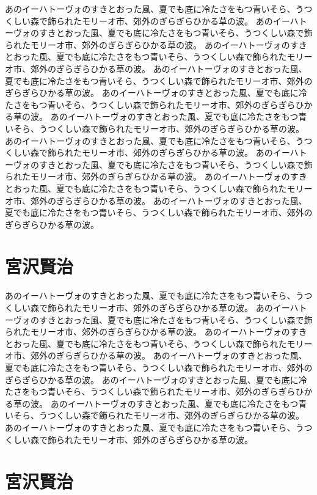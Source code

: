 \documentclass[b5j]{jsbook}
\begin{document}
あのイーハトーヴォのすきとおった風、夏でも底に冷たさをもつ青いそら、うつくしい森で飾られたモリーオ市、郊外のぎらぎらひかる草の波。
あのイーハトーヴォのすきとおった風、夏でも底に冷たさをもつ青いそら、うつくしい森で飾られたモリーオ市、郊外のぎらぎらひかる草の波。
あのイーハトーヴォのすきとおった風、夏でも底に冷たさをもつ青いそら、うつくしい森で飾られたモリーオ市、郊外のぎらぎらひかる草の波。
あのイーハトーヴォのすきとおった風、夏でも底に冷たさをもつ青いそら、うつくしい森で飾られたモリーオ市、郊外のぎらぎらひかる草の波。
あのイーハトーヴォのすきとおった風、夏でも底に冷たさをもつ青いそら、うつくしい森で飾られたモリーオ市、郊外のぎらぎらひかる草の波。
あのイーハトーヴォのすきとおった風、夏でも底に冷たさをもつ青いそら、うつくしい森で飾られたモリーオ市、郊外のぎらぎらひかる草の波。
あのイーハトーヴォのすきとおった風、夏でも底に冷たさをもつ青いそら、うつくしい森で飾られたモリーオ市、郊外のぎらぎらひかる草の波。
あのイーハトーヴォのすきとおった風、夏でも底に冷たさをもつ青いそら、うつくしい森で飾られたモリーオ市、郊外のぎらぎらひかる草の波。
あのイーハトーヴォのすきとおった風、夏でも底に冷たさをもつ青いそら、うつくしい森で飾られたモリーオ市、郊外のぎらぎらひかる草の波。
あのイーハトーヴォのすきとおった風、夏でも底に冷たさをもつ青いそら、うつくしい森で飾られたモリーオ市、郊外のぎらぎらひかる草の波。

\section{宮沢賢治}

あのイーハトーヴォのすきとおった風、夏でも底に冷たさをもつ青いそら、うつくしい森で飾られたモリーオ市、郊外のぎらぎらひかる草の波。
あのイーハトーヴォのすきとおった風、夏でも底に冷たさをもつ青いそら、うつくしい森で飾られたモリーオ市、郊外のぎらぎらひかる草の波。
あのイーハトーヴォのすきとおった風、夏でも底に冷たさをもつ青いそら、うつくしい森で飾られたモリーオ市、郊外のぎらぎらひかる草の波。
あのイーハトーヴォのすきとおった風、夏でも底に冷たさをもつ青いそら、うつくしい森で飾られたモリーオ市、郊外のぎらぎらひかる草の波。
あのイーハトーヴォのすきとおった風、夏でも底に冷たさをもつ青いそら、うつくしい森で飾られたモリーオ市、郊外のぎらぎらひかる草の波。
あのイーハトーヴォのすきとおった風、夏でも底に冷たさをもつ青いそら、うつくしい森で飾られたモリーオ市、郊外のぎらぎらひかる草の波。
あのイーハトーヴォのすきとおった風、夏でも底に冷たさをもつ青いそら、うつくしい森で飾られたモリーオ市、郊外のぎらぎらひかる草の波。

\section{宮沢賢治}
\end{document}
